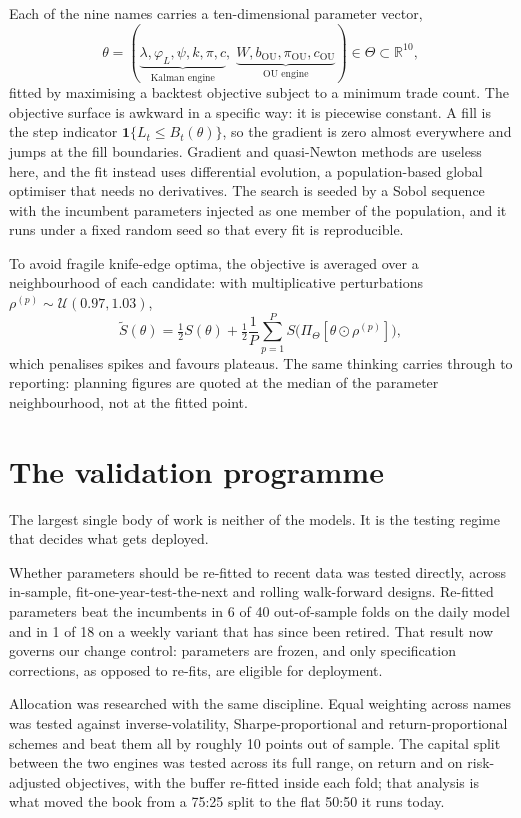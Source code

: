 \documentclass[11pt,a4paper]{article}
\begin{document}
Each of the nine names carries a ten-dimensional parameter vector,
\begin{equation}
\theta=(\underbrace{\lambda,\varphi_L,\psi,k,\pi,c}_{\text{Kalman engine}},\;
\underbrace{W,b_{\text{OU}},\pi_{\text{OU}},c_{\text{OU}}}_{\text{OU engine}})\in\Theta\subset\mathbb R^{10},
\end{equation}
fitted by maximising a backtest objective subject to a minimum trade count.
The objective surface is awkward in a specific way: it is piecewise
constant. A fill is the step indicator $\mathbf 1\{L_t\le B_t(\theta)\}$, so
the gradient is zero almost everywhere and jumps at the fill boundaries.
Gradient and quasi-Newton methods are useless here, and the fit instead uses
differential evolution, a population-based global optimiser that needs no
derivatives. The search is seeded by a Sobol sequence with the incumbent
parameters injected as one member of the population, and it runs under a
fixed random seed so that every fit is reproducible.

To avoid fragile knife-edge optima, the objective is averaged over a
neighbourhood of each candidate: with multiplicative perturbations
$\rho^{(p)}\sim\mathcal U(0.97,1.03)$,
\begin{equation}
\tilde S(\theta)=\tfrac12 S(\theta)+\tfrac12\frac1P\sum_{p=1}^{P}
S\bigl(\Pi_\Theta[\theta\odot\rho^{(p)}]\bigr),
\end{equation}
which penalises spikes and favours plateaus. The same thinking carries
through to reporting: planning figures are quoted at the median of the
parameter neighbourhood, not at the fitted point.

\section{The validation programme}

The largest single body of work is neither of the models. It is the testing
regime that decides what gets deployed.

Whether parameters should be re-fitted to recent data was tested directly,
across in-sample, fit-one-year-test-the-next and rolling walk-forward
designs. Re-fitted parameters beat the incumbents in 6 of 40 out-of-sample
folds on the daily model and in 1 of 18 on a weekly variant that has since
been retired. That result now governs our change control: parameters are
frozen, and only specification corrections, as opposed to re-fits, are
eligible for deployment.

Allocation was researched with the same discipline. Equal weighting across
names was tested against inverse-volatility, Sharpe-proportional and
return-proportional schemes and beat them all by roughly 10 points out of
sample. The capital split between the two engines was tested across its full
range, on return and on risk-adjusted objectives, with the buffer re-fitted
inside each fold; that analysis is what moved the book from a 75:25 split to
the flat 50:50 it runs today.
\end{document}
